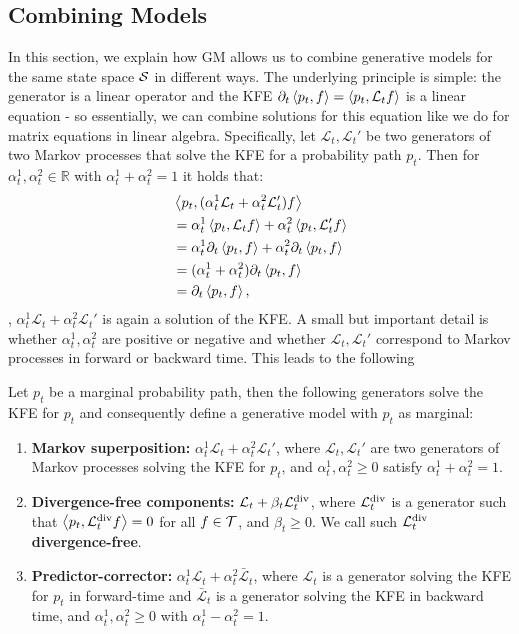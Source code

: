 \documentclass{fairmeta}
\newcommand{\highlight}[1]{{\color{metablue} \textbf{#1}}}
\numberwithin{equation}{section}
\begin{document}
\subsection{Combining Models}
\label{subsec:gm_combining_models}
In this section, we explain how GM allows us to combine generative models for the same state space ${\mathcal{S}}$ in different ways.  The underlying principle is simple: the generator is a linear operator and the KFE $\partial_t\left \langle p_t, f\right \rangle= \left \langle p_t, \mathcal{L}_t f\right \rangle$ is a linear equation - so essentially, we can combine solutions for this equation like we do for matrix equations in linear algebra. Specifically, let $\mathcal{L}_t,\mathcal{L}_t'$ be two generators of two Markov processes that solve the KFE for a probability path $p_t$. Then for $\alpha^1_t,\alpha^2_t\in \mathbb{R}$ with $\alpha^1_t+\alpha^2_t=1$ it holds that:
\begin{align}
&\left \langle p_t, (\alpha^1_t\mathcal{L}_t+\alpha^2_t\mathcal{L}_t')f\right \rangle\\
&= \alpha^1_t \left \langle p_t, \mathcal{L}_tf\right \rangle+\alpha^2_t\left \langle p_t, \mathcal{L}_t'f\right \rangle \\
&= \alpha^1_t\partial_t\left \langle p_t, f\right \rangle + \alpha^2_t\partial_t\left \langle p_t, f\right \rangle \\
&= (\alpha^1_t+\alpha^2_t)\partial_t\left \langle p_t, f\right \rangle\\
&=\partial_t\left \langle p_t, f\right \rangle,
\end{align}
\ie, $\alpha_t^1\mathcal{L}_t+\alpha^2_t\mathcal{L}_t'$ is again a solution of the KFE. A small but important detail is whether $\alpha_t^{1},\alpha_t^2$ are positive or negative and whether $\mathcal{L}_t,\mathcal{L}_t'$ correspond to Markov processes in forward or backward time. This leads to the following
\begin{myframe}
\begin{proposition} 
\label{prop:markov_superposition}
Let $p_t$ be a marginal probability path, then the following generators solve the KFE for $p_t$ and consequently define a generative model with $p_t$ as marginal:
\begin{enumerate}
\item \highlight{Markov superposition: } $\alpha_t^1\mathcal{L}_t+\alpha^2_t\mathcal{L}_t'$, where $\mathcal{L}_t,\mathcal{L}_t'$ are two generators of Markov processes solving the KFE for $p_t$, and $\alpha_t^{1},\alpha_t^{2}\geq 0$ satisfy $\alpha^1_t+\alpha^2_t=1$.
\item \highlight{Divergence-free components:} $\mathcal{L}_t+\beta_t\mathcal{L}_t^{\mathrm{div}}$, where $\mathcal{L}_t^{\mathrm{div}}$ is a generator such that $\left \langle p_t, \mathcal{L}_t^{\mathrm{div}}f\right \rangle=0$ for all $f\in {\mathcal{T}}$, and $\beta_t\geq 0$. We call such $\mathcal{L}_t^{\mathrm{div}}$ \highlight{divergence-free}. \vspace{-0.3em}
\item \highlight{Predictor-corrector: }$\alpha^1_t\mathcal{L}_t+\alpha^2_t\bar{\mathcal{L}}_t$, where $\mathcal{L}_t$ is a generator solving the KFE for $p_t$ in forward-time and $\bar{\mathcal{L}}_t$ is a generator solving the KFE in backward time, and  $\alpha_t^{1},\alpha_t^{2}\geq 0$ with $\alpha^1_t-\alpha^2_t=1$. 
\end{enumerate}
\end{proposition}
\end{myframe}
\end{document}
